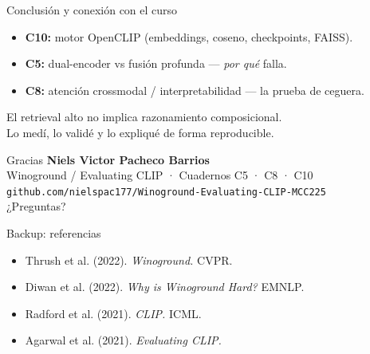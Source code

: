 \documentclass[aspectratio=169]{beamer}
\begin{document}
\begin{frame}{Conclusión y conexión con el curso}
  \begin{itemize}
    \item \textbf{C10:} motor OpenCLIP (embeddings, coseno, checkpoints, FAISS).
    \item \textbf{C5:} dual-encoder vs fusión profunda — \emph{por qué} falla.
    \item \textbf{C8:} atención crossmodal / interpretabilidad — la prueba de ceguera.
  \end{itemize}
  \vfill
  \centering\Large El retrieval alto \alert{no} implica razonamiento composicional.\\
  \normalsize Lo medí, lo validé y lo expliqué de forma reproducible.
\end{frame}

\begin{frame}{Gracias}
  \centering
  \textbf{Niels Victor Pacheco Barrios}\\[2pt]
  \footnotesize Winoground / Evaluating CLIP · Cuadernos C5 · C8 · C10\\[6pt]
  \texttt{github.com/nielspac177/Winoground-Evaluating-CLIP-MCC225}\\[10pt]
  \normalsize ¿Preguntas?
\end{frame}

\appendix
\begin{frame}{Backup: referencias}
  \footnotesize
  \begin{itemize}
    \item Thrush et al. (2022). \textit{Winoground.} CVPR.
    \item Diwan et al. (2022). \textit{Why is Winoground Hard?} EMNLP.
    \item Radford et al. (2021). \textit{CLIP.} ICML.
    \item Agarwal et al. (2021). \textit{Evaluating CLIP.}
  \end{itemize}
\end{frame}
\end{document}
